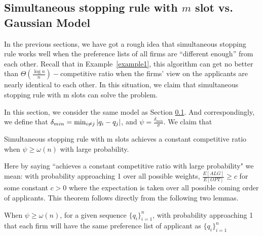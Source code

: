 \subsection{Simultaneous stopping rule with $m$ slot vs. Gaussian Model}

In the previous sections, we have got a rough idea that simultaneous stopping rule works well when the preference lists of all firms are ``different enough'' from each other.
Recall that in Example~\ref{example1}, this algorithm can get no better than $\Theta(\frac{\log n}{n})-$competitive ratio when the firms' view on the applicants are nearly identical to each other.
In this situation, we claim that simultaneous stopping rule with m slots can solve the problem.

In this section, we consider the same model as Section \ref{}.
And correspondingly, we
define that $\delta_{min} = \min_{i \neq j} \left\vert q_i - q_j\right\vert$, and
$\psi = \frac{\delta_{min}}{\sigma}$.
We claim that


\begin{theorem} \label{northm2}
    Simultaneous stopping rule with m slots achieves a constant competitive
    ratio when $\psi \ge \omega(n)$ with large probability.
\end{theorem}

Here by saying ``achieves a constant competitive ratio with large probability" we mean:
with probability approaching 1 over all possible weights, 
$\frac{E[ALG]}{E[OPT]} \ge c$ for some constant $c > 0$ where 
the expectation is taken over all possible coming order of applicants.
This theorem follows directly from the following two lemmas.

\begin{lemma} \label{orderlem}
    When $\psi \ge \omega(n)$, for a given sequence $\{q_i\}_{i=1}^{n}$, with probability approaching 1 that
    each firm will have the same preference list of applicant as $\{q_i\}_{i=1}^{n}$

\end{lemma}

